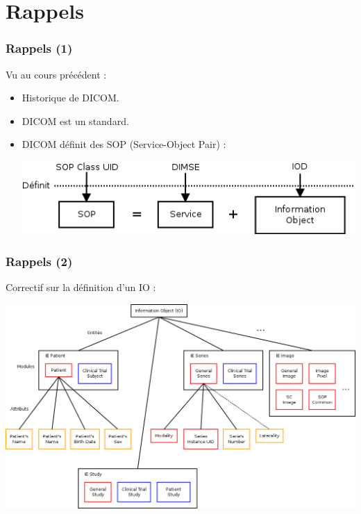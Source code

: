 \section{Rappels}

\frame
{
	\frametitle{Rappels (1)}
	Vu au cours pr\'ec\'edent :
	\begin{itemize}
		\item Historique de DICOM.
		\item DICOM est un standard.
		\item DICOM d\'efinit des SOP (Service-Object Pair) :
		\begin{center}
			\includegraphics[width=\linewidth]{./figures/sop-definition.png}
		\end{center}
	
	\end{itemize}
}

\frame
{
	\frametitle{Rappels (2)}
	Correctif sur la d\'efinition d'un IO :
	\begin{center}
		\includegraphics[width=\linewidth]{./figures/IO-definition.png}
	\end{center}
}

